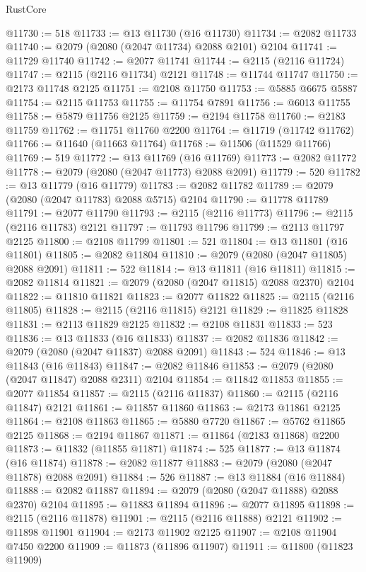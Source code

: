 \begin{lexlean}{RustCore}
\begin{coremodule}
@11730 := 518
@11733 := @13 @11730 (@16 @11730)
@11734 := @2082 @11733
@11740 := @2079 (@2080 (@2047 @11734) @2088 @2101) @2104
@11741 := @11729 @11740
@11742 := @2077 @11741
@11744 := @2115 (@2116 @11724)
@11747 := @2115 (@2116 @11734) @2121
@11748 := @11744 @11747
@11750 := @2173 @11748 @2125
@11751 := @2108 @11750
@11753 := @5885 @6675 @5887
@11754 := @2115 @11753
@11755 := @11754 @7891
@11756 := @6013 @11755
@11758 := @5879 @11756 @2125
@11759 := @2194 @11758
@11760 := @2183 @11759
@11762 := @11751 @11760 @2200
@11764 := @11719 (@11742 @11762)
@11766 := @11640 (@11663 @11764)
@11768 := @11506 (@11529 @11766)
@11769 := 519
@11772 := @13 @11769 (@16 @11769)
@11773 := @2082 @11772
@11778 := @2079 (@2080 (@2047 @11773) @2088 @2091)
@11779 := 520
@11782 := @13 @11779 (@16 @11779)
@11783 := @2082 @11782
@11789 := @2079 (@2080 (@2047 @11783) @2088 @5715) @2104
@11790 := @11778 @11789
@11791 := @2077 @11790
@11793 := @2115 (@2116 @11773)
@11796 := @2115 (@2116 @11783) @2121
@11797 := @11793 @11796
@11799 := @2113 @11797 @2125
@11800 := @2108 @11799
@11801 := 521
@11804 := @13 @11801 (@16 @11801)
@11805 := @2082 @11804
@11810 := @2079 (@2080 (@2047 @11805) @2088 @2091)
@11811 := 522
@11814 := @13 @11811 (@16 @11811)
@11815 := @2082 @11814
@11821 := @2079 (@2080 (@2047 @11815) @2088 @2370) @2104
@11822 := @11810 @11821
@11823 := @2077 @11822
@11825 := @2115 (@2116 @11805)
@11828 := @2115 (@2116 @11815) @2121
@11829 := @11825 @11828
@11831 := @2113 @11829 @2125
@11832 := @2108 @11831
@11833 := 523
@11836 := @13 @11833 (@16 @11833)
@11837 := @2082 @11836
@11842 := @2079 (@2080 (@2047 @11837) @2088 @2091)
@11843 := 524
@11846 := @13 @11843 (@16 @11843)
@11847 := @2082 @11846
@11853 := @2079 (@2080 (@2047 @11847) @2088 @2311) @2104
@11854 := @11842 @11853
@11855 := @2077 @11854
@11857 := @2115 (@2116 @11837)
@11860 := @2115 (@2116 @11847) @2121
@11861 := @11857 @11860
@11863 := @2173 @11861 @2125
@11864 := @2108 @11863
@11865 := @5880 @7720
@11867 := @5762 @11865 @2125
@11868 := @2194 @11867
@11871 := @11864 (@2183 @11868) @2200
@11873 := @11832 (@11855 @11871)
@11874 := 525
@11877 := @13 @11874 (@16 @11874)
@11878 := @2082 @11877
@11883 := @2079 (@2080 (@2047 @11878) @2088 @2091)
@11884 := 526
@11887 := @13 @11884 (@16 @11884)
@11888 := @2082 @11887
@11894 := @2079 (@2080 (@2047 @11888) @2088 @2370) @2104
@11895 := @11883 @11894
@11896 := @2077 @11895
@11898 := @2115 (@2116 @11878)
@11901 := @2115 (@2116 @11888) @2121
@11902 := @11898 @11901
@11904 := @2173 @11902 @2125
@11907 := @2108 @11904 @7450 @2200
@11909 := @11873 (@11896 @11907)
@11911 := @11800 (@11823 @11909)

\end{coremodule}
\end{lexlean}
